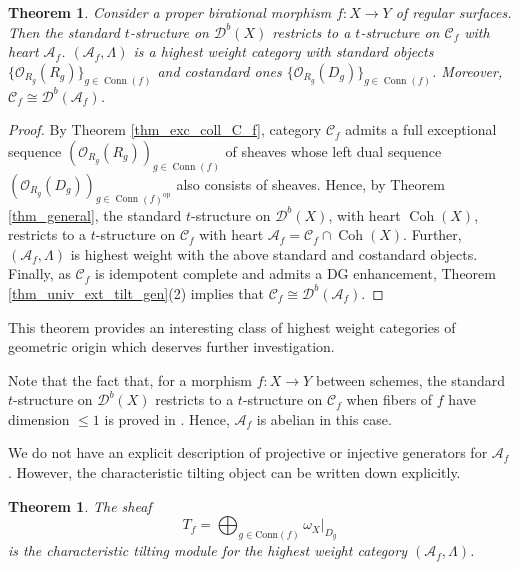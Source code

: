 \documentclass[12pt,a4paper]{amsart}
\newcommand{\cC}{{\mathcal{C}}}
\newcommand{\dD}{{\mathcal{D}}}
\newcommand{\oO}{{\mathcal{O}}}
\newcommand{\tr}{{\mbox{$t$-struc}\-tu\-r}}
\newcommand{\Coh}{\mathop{\operatorname{Coh}}\nolimits}
\newcommand{\Conn}{\mathop{\textrm{Conn}}\nolimits}
\newcommand{\opp}{\mathop{\textrm{op}}\nolimits}
\newtheorem{THM}[LEM]{Theorem}
\theoremstyle{definition}
\begin{document}
\begin{THM}\label{thm_surfaces}
	Consider a proper birational morphism $f\colon X\to Y$ of regular surfaces. Then the standard \tr e on $\dD^b(X)$ restricts to a \tr e on $\cC_f$ with heart $\mathscr{A}_f $.  $(\mathscr{A}_f,\Lambda)$ is a highest weight category with standard objects $\{\oO_{R_g}(R_g)\}_{g\in \Conn(f)}$ and costandard ones $\{\oO_{R_g}(D_g)\}_{g\in \Conn(f)}$. Moreover, $\cC_f\cong \dD^b(\mathscr{A}_f)$.
\end{THM}
\begin{proof}
	By Theorem \ref{thm_exc_coll_C_f}, category $\cC_f$ admits a full exceptional  sequence  $\left( \oO_{R_g}(R_g)\right)_{g\in \Conn(f)}$ of sheaves whose left dual sequence $\left(  \oO_{R_g}(D_{g}) \right)_{g\in \Conn(f)^{\opp}}$ also consists of sheaves. Hence, by Theorem \ref{thm_general}, the standard \tr e on $\dD^b(X)$, with heart $\Coh(X)$, restricts to a \tr e on $\cC_f$ with heart $\mathscr{A}_f = \cC_f\cap \Coh(X)$. Further, $(\mathscr{A}_f,\Lambda)$ is highest weight with the above standard and costandard objects. Finally, as $\cC_f$ is idempotent complete and admits a DG enhancement, Theorem \ref{thm_univ_ext_tilt_gen}(2) implies that $\cC_f\cong\dD^b(\mathscr{A}_f)$.
\end{proof}
 This theorem provides an interesting class of highest weight categories of geometric origin which deserves further investigation.
 


Note that the fact that, for a morphism $f\colon X\to Y$ between schemes, the standard \tr e on $\dD^b(X)$ restricts to a \tr e on $\cC_f$ when fibers of $f$ have dimension $\leq 1$ is proved in \cite{Br1}. Hence, $\mathscr{A}_f$ is abelian in this case.



We do not have an explicit description of projective or injective generators for $\mathscr{A}_f$. However, the characteristic tilting object can be written down explicitly.
\begin{THM}\label{thm_tilting_for_surf}
The sheaf
$$
T_f = \bigoplus_{g\in \textrm{Conn}(f)} \omega_X|_{D_g}
$$
is the characteristic tilting module for the highest weight category $(\mathscr{A}_f, \Lambda)$.
\end{THM}
\end{document}
